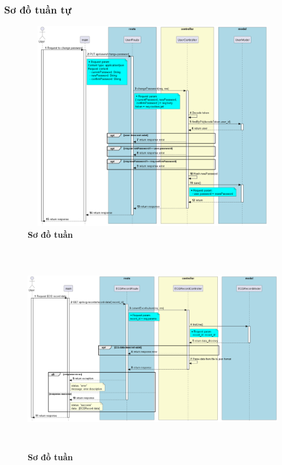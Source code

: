 \subsubsection{Sơ đồ tuần tự}

\begin{figure}[H]
  \centering
  \includegraphics[width=16cm,height=9cm]{Images/server/sequence/server/changePassword.png}
  \caption[Sơ đồ tuần tự ]{\bfseries \fontsize{12pt}{0pt}
  \selectfont Sơ đồ tuần }
  \label{hinh21} %
\end{figure}


\begin{figure}[H]
  \centering
  \includegraphics[width=16cm,height=9cm]{Images/server/sequence/server/convertExceltoJson.png}
  \caption[Sơ đồ tuần tự ]{\bfseries \fontsize{12pt}{0pt}
  \selectfont Sơ đồ tuần }
  \label{hinh21} %
\end{figure}



